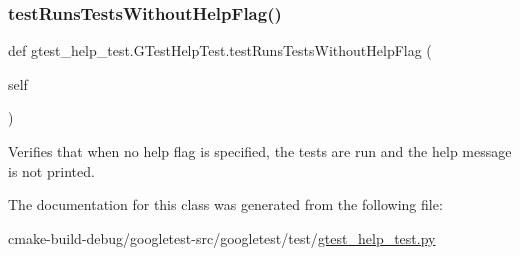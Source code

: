 \subsubsection{\texorpdfstring{testRunsTestsWithoutHelpFlag()}{testRunsTestsWithoutHelpFlag()}}
{\footnotesize\ttfamily def gtest\+\_\+help\+\_\+test.\+G\+Test\+Help\+Test.\+test\+Runs\+Tests\+Without\+Help\+Flag (\begin{DoxyParamCaption}\item[{}]{self }\end{DoxyParamCaption})}

\begin{DoxyVerb}Verifies that when no help flag is specified, the tests are run
and the help message is not printed.\end{DoxyVerb}
 

The documentation for this class was generated from the following file\+:\begin{DoxyCompactItemize}
\item 
cmake-\/build-\/debug/googletest-\/src/googletest/test/\mbox{\hyperlink{gtest__help__test_8py}{gtest\+\_\+help\+\_\+test.\+py}}\end{DoxyCompactItemize}
